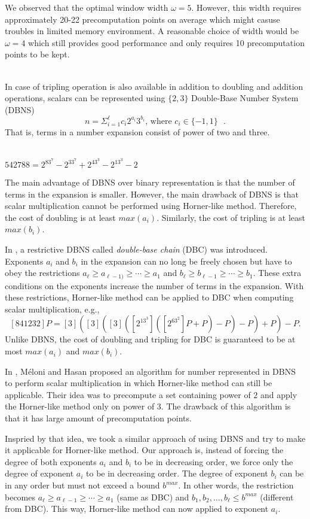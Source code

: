 We observed that the optimal window width $\omega = 5$.
However, this width requires approximately 20-22 precomputation points on average
which might casuse troubles in limited memory environment.
A reasonable choice of width would be $\omega = 4$ which still provides good performance
and only requires 10 precomputation points to be kept.



 \\
In case of tripling operation is also available in addition to doubling and addition operations,
scalars can be represented using $\{2,3\}$ Double-Base Number System (DBNS)
$$n = \Sigma^{\ell}_{i=1} c_i 2^{a_i}3^{b_i} \text{, where $c_i \in \{-1,1\}$ }.$$
That is, terms in a number expansion consist of power of two and three.

 \\
$542788 = 2^83^7 - 2^33^7 + 2^43^3 - 2^13^3 - 2$

The main advantage of DBNS over binary representation is that the number of terms in the expansion is smaller.
However, the main drawback of DBNS is that scalar multiplication cannot be performed using Horner-like method.
Therefore, the cost of doubling is at least $max(a_i)$.  Similarly, the cost of tripling is at least $max(b_i)$.

In \cite{DIM05}, a restrictive DBNS called {\it{double-base chain}} (DBC) was introduced.
Exponents $a_i$ and $b_i$ in the expansion can no long be freely chosen but have to obey the restrictions
$a_\ell \ge a_{\ell-1)} \ge \cdots \ge a_1$ and $b_\ell \ge b_{\ell-1} \ge \cdots \ge b_1$.
These extra conditions on the exponents increase the number of terms in the expansion.
With these restrictions, Horner-like method can be applied to DBC when computing scalar multiplication, e.g.,
$$[841232]P = [3]([3]([3]([2^13^3]([2^63^2]P+P)-P)-P)+P)-P.$$
Unlike DBNS, the cost of doubling and tripling for DBC is guaranteed to be at most $max(a_i)$ and $max(b_i)$.

In \cite{MH09}, M\'eloni and Hasan proposed an algorithm for number represented in DBNS to perform scalar multiplication
in which Horner-like method can still be applicable.
Their idea was to precompute a set containing power of $2$ and apply the Horner-like method only on power of $3$.
The drawback of this algorithm is that it has large amount of precomputation points.

Inspried by that idea, we took a similar approach of using DBNS and try to make it applicable for Horner-like method.
Our approach is, instead of forcing the degree of both exponents $a_i$ and $b_i$ to be in decreasing order,
we force only the degree of exponent $a_i$ to be in decreasing order.
The degree of exponent $b_i$ can be in any order but must not exceed a bound $b^{max}$.
In other words, the restriction becomes
$a_\ell \ge a_{\ell-1} \ge \cdots \ge a_1$ (same as DBC) and $b_1,b_2,\dots,b_\ell \le b^{max}$ (different from DBC).
This way, Horner-like method can now applied to exponent $a_i$.

